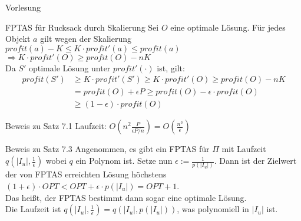 \begin{section}{Vorlesung}
  \begin{subsection}{FPTAS für Rucksack durch Skalierung}
   Sei $O$ eine optimale Lösung. Für jedes Objekt $a$ gilt wegen der Skalierung $profit(a) - K \leq K \cdot profit'(a) \leq profit(a)$\\
   $\Rightarrow K \cdot profit'(O) \geq profit(O) - nK$ \\
   Da $S'$ optimale Lösung unter $profit'(\cdot)$ ist, gilt:
   \begin{align*}
   profit(S') &\geq K\cdot profit'(S') \geq K \cdot profit'(O) \geq profit(O) - nK \\
   &= profit(O) + \epsilon P \geq profit(O) - \epsilon \cdot profit(O)\\
   &\geq (1-\epsilon)\cdot profit(O)
   \end{align*}
  \end{subsection}
  \begin{subsection}{Beweis zu Satz 7.1}
   Laufzeit: $O(n^2\frac{P}{\epsilon P / n}) = O(\frac{n^3}{\epsilon})$
  \end{subsection}
  \begin{subsection}{Beweis zu Satz 7.3}
   Angenommen, es gibt ein FPTAS für $\Pi$ mit Laufzeit $q(|I_u|, \frac{1}{\epsilon})$ wobei $q$ ein Polynom ist. Setze nun $\epsilon := \frac{1}{p(|I_u|)}$. Dann ist der Zielwert der von FPTAS erreichten Lösung höchstens $(1+\epsilon) \cdot OPT < OPT + \epsilon \cdot p(|I_u|) = OPT +1 $.\\
   Das heißt, der FPTAS bestimmt dann sogar eine optimale Lösung. \\
   Die Laufzeit ist $q(|I_u|, \frac{1}{\epsilon}) = q(|I_u|, p(|I_u|))$, was polynomiell in $|I_u|$ ist.
  \end{subsection}
\end{section}

